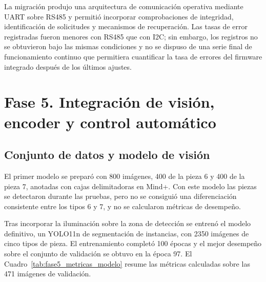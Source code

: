 La migración produjo una arquitectura de comunicación operativa mediante UART sobre RS485 y permitió incorporar comprobaciones de integridad, identificación de solicitudes y mecanismos de recuperación. Las tasas de error registradas fueron menores con RS485 que con I2C; sin embargo, los registros no se obtuvieron bajo las mismas condiciones y no se dispuso de una serie final de funcionamiento continuo que permitiera cuantificar la tasa de errores del firmware integrado después de los últimos ajustes.



\section{Fase 5. Integración de visión, encoder y control automático}
\label{sec:resultados_fase5}


\subsection{Conjunto de datos y modelo de visión}

El primer modelo se preparó con 800 imágenes, 400 de la pieza 6 y 400 de la pieza 7, anotadas con cajas delimitadoras en Mind+. Con este modelo las piezas se detectaron durante las pruebas, pero no se consiguió una diferenciación consistente entre los tipos 6 y 7, y no se calcularon métricas de desempeño.

Tras incorporar la iluminación sobre la zona de detección se entrenó el modelo definitivo, un YOLO11n de segmentación de instancias, con 2350 imágenes de cinco tipos de pieza. El entrenamiento completó 100 épocas y el mejor desempeño sobre el conjunto de validación se obtuvo en la época 97. El Cuadro~\ref{tab:fase5_metricas_modelo} resume las métricas calculadas sobre las 471 imágenes de validación.

